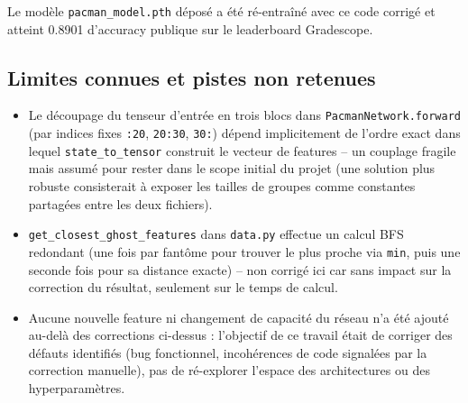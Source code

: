 \documentclass[a4paper,12pt]{article}
\begin{document}
Le modèle \texttt{pacman\_model.pth} déposé a été ré-entraîné avec ce
code corrigé et atteint 0.8901 d'accuracy publique sur le leaderboard
Gradescope.

\subsection{Limites connues et pistes non retenues}

\begin{itemize}
    \item Le découpage du tenseur d'entrée en trois blocs dans
    \texttt{PacmanNetwork.forward} (par indices fixes \texttt{:20},
    \texttt{20:30}, \texttt{30:}) dépend implicitement de l'ordre exact
    dans lequel \texttt{state\_to\_tensor} construit le vecteur de
    features -- un couplage fragile mais assumé pour rester dans le
    scope initial du projet (une solution plus robuste consisterait à
    exposer les tailles de groupes comme constantes partagées entre les
    deux fichiers).
    \item \texttt{get\_closest\_ghost\_features} dans \texttt{data.py}
    effectue un calcul BFS redondant (une fois par fantôme pour trouver
    le plus proche via \texttt{min}, puis une seconde fois pour sa
    distance exacte) -- non corrigé ici car sans impact sur la
    correction du résultat, seulement sur le temps de calcul.
    \item Aucune nouvelle feature ni changement de capacité du réseau
    n'a été ajouté au-delà des corrections ci-dessus : l'objectif de ce
    travail était de corriger des défauts identifiés (bug fonctionnel,
    incohérences de code signalées par la correction manuelle), pas de
    ré-explorer l'espace des architectures ou des hyperparamètres.
\end{itemize}
\end{document}

